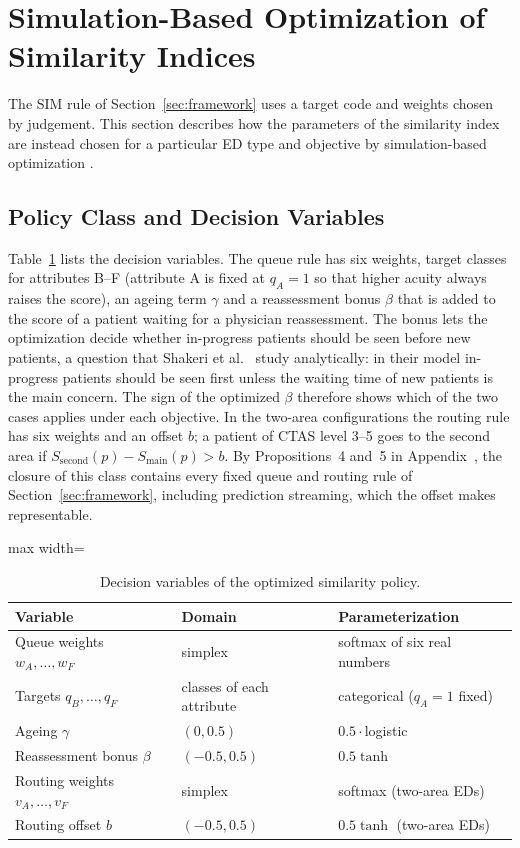 \section{Simulation-Based Optimization of Similarity Indices}
\label{sec:optimization}

The SIM rule of Section~\ref{sec:framework} uses a target code and weights chosen by judgement. This section describes how the parameters of the similarity index are instead chosen for a particular ED type and objective by simulation-based optimization \cite{amaran2016simulation}.

\subsection{Policy Class and Decision Variables}

Table~\ref{tab:decision} lists the decision variables. The queue rule has six weights, target classes for attributes B--F (attribute A is fixed at $q_A=1$ so that higher acuity always raises the score), an ageing term $\gamma$ and a reassessment bonus $\beta$ that is added to the score of a patient waiting for a physician reassessment. The bonus lets the optimization decide whether in-progress patients should be seen before new patients, a question that Shakeri et al.\ \cite{Shakeri2025_WhoToSeeNext} study analytically: in their model in-progress patients should be seen first unless the waiting time of new patients is the main concern. The sign of the optimized $\beta$ therefore shows which of the two cases applies under each objective. In the two-area configurations the routing rule has six weights and an offset $b$; a patient of CTAS level 3--5 goes to the second area if $S_{\text{second}}(p)-S_{\text{main}}(p)>b$. By Propositions~4 and~5 in Appendix~, the closure of this class contains every fixed queue and routing rule of Section~\ref{sec:framework}, including prediction streaming, which the offset makes representable.

\begin{table}[!htbp]
\centering
\caption{Decision variables of the optimized similarity policy.}
\label{tab:decision}
\footnotesize
\begin{adjustbox}{max width=\linewidth}\begin{tabular}{llp{3.4cm}}
\toprule
Variable & Domain & Parameterization \\
\midrule
Queue weights $w_A,\dots,w_F$ & simplex & softmax of six real numbers \\
Targets $q_B,\dots,q_F$ & classes of each attribute & categorical ($q_A=1$ fixed) \\
Ageing $\gamma$ & $(0,0.5)$ & $0.5\cdot$logistic \\
Reassessment bonus $\beta$ & $(-0.5,0.5)$ & $0.5\tanh$ \\
Routing weights $v_A,\dots,v_F$ & simplex & softmax (two-area EDs) \\
Routing offset $b$ & $(-0.5,0.5)$ & $0.5\tanh$ (two-area EDs) \\
\bottomrule
\end{tabular}\end{adjustbox}
\end{table}

